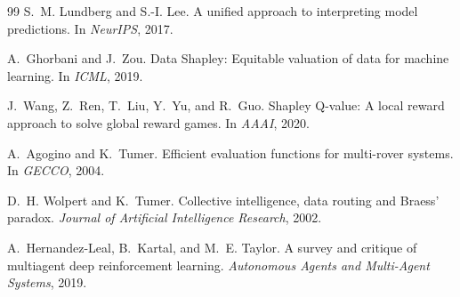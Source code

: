 \documentclass[11pt,a4paper]{article}
\begin{document}
\begin{thebibliography}{99}
S.~M. Lundberg and S.-I. Lee.
\newblock A unified approach to interpreting model predictions.
\newblock In \emph{NeurIPS}, 2017.

A.~Ghorbani and J.~Zou.
\newblock Data Shapley: Equitable valuation of data for machine learning.
\newblock In \emph{ICML}, 2019.

J.~Wang, Z.~Ren, T.~Liu, Y.~Yu, and R.~Guo.
\newblock Shapley Q-value: A local reward approach to solve global reward games.
\newblock In \emph{AAAI}, 2020.

A.~Agogino and K.~Tumer.
\newblock Efficient evaluation functions for multi-rover systems.
\newblock In \emph{GECCO}, 2004.

D.~H. Wolpert and K.~Tumer.
\newblock Collective intelligence, data routing and Braess' paradox.
\newblock \emph{Journal of Artificial Intelligence Research}, 2002.

A.~Hernandez-Leal, B.~Kartal, and M.~E. Taylor.
\newblock A survey and critique of multiagent deep reinforcement learning.
\newblock \emph{Autonomous Agents and Multi-Agent Systems}, 2019.

\end{thebibliography}
\end{document}
